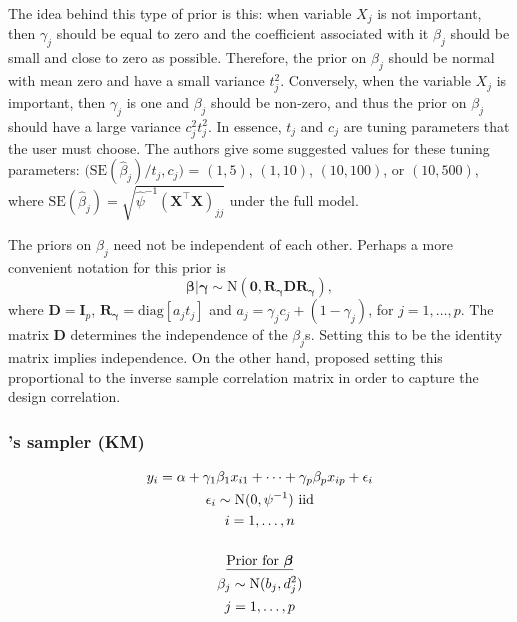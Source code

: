 The idea behind this type of prior is this: when variable $X_j$ is not important, then $\gamma_j$ should be equal to zero and the coefficient associated with it $\beta_j$ should be small and close to zero as possible. Therefore, the prior on $\beta_j$ should be normal with mean zero and have a small variance $t_j^2$. Conversely, when the variable $X_j$ is important, then $\gamma_j$ is one and $\beta_j$ should be non-zero, and thus the prior on $\beta_j$ should have a large variance $c_j^2 t_j^2$. In essence, $t_j$ and $c_j$ are tuning parameters that the user must choose. The authors give some suggested values for these tuning parameters: $\big(\text{SE}(\hat\beta_j)/t_j, c_j\big)$ = $(1,5)$, $(1,10)$, $(10,100)$, or $(10,500)$, where $\text{SE}(\hat\beta_j) = \sqrt{\hat\psi^{-1}(\mathbf X^\top\mathbf X)_{jj}}$ under the full model.

The priors on $\beta_j$ need not be independent of each other. Perhaps a more convenient notation for this prior is 
\[
	\boldsymbol\beta|\boldsymbol\gamma \sim \text{N}(\mathbf 0, \mathbf R_{\boldsymbol\gamma}\mathbf D \mathbf R_{\boldsymbol\gamma}), 
\]
where $\mathbf D = \mathbf I_p$, $\mathbf R_{\boldsymbol\gamma}=\text{diag}[a_jt_j]$ and $a_j = \gamma_j c_j + (1-\gamma_j)$, for $j=1,\dots,p$. The matrix $\mathbf D$ determines the independence of the $\beta_j$s. Setting this to be the identity matrix implies independence. On the other hand, \cite{George1993} proposed setting this proportional to the inverse sample correlation matrix in order to capture the design correlation.

\vspace{-0.5mm}
\subsubsection{\texorpdfstring{\citeauthor{Kuo1998}'s}{Kuo and Mallick's} sampler (KM)}

\vspace{-1mm}
\begin{align}
	\begin{gathered} 
		y_i = \alpha + \gamma_1\beta_1 x_{i1} + \dots + \gamma_p\beta_p x_{ip} + \epsilon_i \\
		\epsilon_i \sim \text{N}(0, \psi^{-1}) \text{ iid} \\
		i = 1,\dots,n \\
		\vspace{-0.5mm}\\
		\text{\underline{Prior for $\boldsymbol\beta$}} \\
		\beta_j \sim \text{N}(b_j,d_j^2) \\
		j=1,\dots,p
	\end{gathered}
\end{align}


